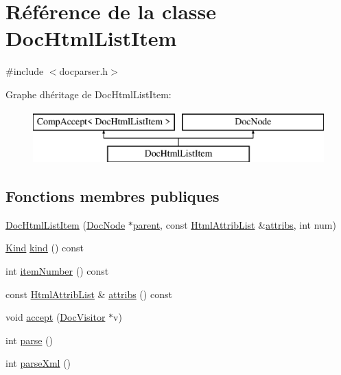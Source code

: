 \hypertarget{class_doc_html_list_item}{}\section{Référence de la classe Doc\+Html\+List\+Item}
\label{class_doc_html_list_item}


{\ttfamily \#include $<$docparser.\+h$>$}

Graphe d\textquotesingle{}héritage de Doc\+Html\+List\+Item\+:\begin{figure}[H]
\begin{center}
\leavevmode
\includegraphics[height=2.000000cm]{class_doc_html_list_item}
\end{center}
\end{figure}
\subsection*{Fonctions membres publiques}
\begin{DoxyCompactItemize}
\item 
\hyperlink{class_doc_html_list_item_ae73e56511ea1e13dc4ecb240a2291bb8}{Doc\+Html\+List\+Item} (\hyperlink{class_doc_node}{Doc\+Node} $\ast$\hyperlink{class_doc_node_a990d8b983962776a647e6231d38bd329}{parent}, const \hyperlink{class_html_attrib_list}{Html\+Attrib\+List} \&\hyperlink{class_doc_html_list_item_a5d77a8255fdd27a34ace38b1fe60ed1f}{attribs}, int num)
\item 
\hyperlink{class_doc_node_aebd16e89ca590d84cbd40543ea5faadb}{Kind} \hyperlink{class_doc_html_list_item_a943a9497abc63b442fdbdefbac9b9c9e}{kind} () const 
\item 
int \hyperlink{class_doc_html_list_item_adb9b0ed9e62bb70e2ab300a0fc4cd215}{item\+Number} () const 
\item 
const \hyperlink{class_html_attrib_list}{Html\+Attrib\+List} \& \hyperlink{class_doc_html_list_item_a5d77a8255fdd27a34ace38b1fe60ed1f}{attribs} () const 
\item 
void \hyperlink{class_doc_html_list_item_af6b3a9f366666555c4dcceecc1a0742e}{accept} (\hyperlink{class_doc_visitor}{Doc\+Visitor} $\ast$v)
\item 
int \hyperlink{class_doc_html_list_item_a950e04796a8834be581d76e7e1bd2c77}{parse} ()
\item 
int \hyperlink{class_doc_html_list_item_a4757869d31645ffa5ad52ed2c66fa943}{parse\+Xml} ()
\end{DoxyCompactItemize}
